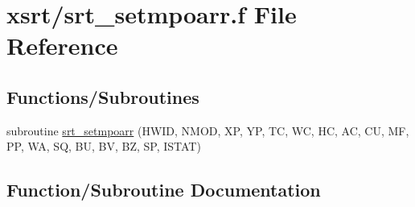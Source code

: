 \hypertarget{srt__setmpoarr_8f}{}\section{xsrt/srt\+\_\+setmpoarr.f File Reference}
\label{srt__setmpoarr_8f}
\subsection*{Functions/\+Subroutines}
\begin{DoxyCompactItemize}
\item 
subroutine \hyperlink{srt__setmpoarr_8f_ab47c66a859b26596ffc7306bbd2ac844}{srt\+\_\+setmpoarr} (H\+W\+ID, N\+M\+OD, XP, YP, TC, WC, HC, AC, CU, MF, PP, WA, SQ, BU, BV, BZ, SP, I\+S\+T\+AT)
\end{DoxyCompactItemize}


\subsection{Function/\+Subroutine Documentation}
\mbox{\label{srt__setmpoarr_8f_ab47c66a859b26596ffc7306bbd2ac844}} 
